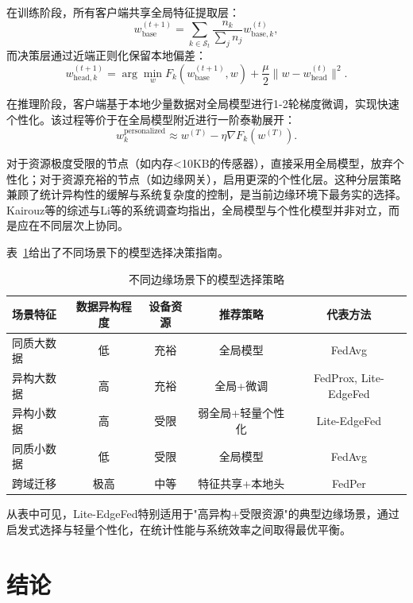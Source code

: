 \documentclass[a4paper,12pt]{article}
\begin{document}
在训练阶段，所有客户端共享全局特征提取层：
\begin{equation}
w_{\text{base}}^{(t+1)} = \sum_{k \in \mathcal{S}_t} \frac{n_k}{\sum_{j} n_j} w_{\text{base},k}^{(t)},
\end{equation}
而决策层通过近端正则化保留本地偏差：
\begin{equation}
w_{\text{head},k}^{(t+1)} = \arg\min_{w} F_k(w_{\text{base}}^{(t+1)}, w) + \frac{\mu}{2}\|w - w_{\text{head}}^{(t)}\|^2.
\end{equation}

在推理阶段，客户端基于本地少量数据对全局模型进行1-2轮梯度微调，实现快速个性化。该过程等价于在全局模型附近进行一阶泰勒展开：
\begin{equation}
w_k^{\text{personalized}} \approx w^{(T)} - \eta \nabla F_k(w^{(T)}).
\end{equation}

对于资源极度受限的节点（如内存<10KB的传感器），直接采用全局模型，放弃个性化；对于资源充裕的节点（如边缘网关），启用更深的个性化层。这种分层策略兼顾了统计异构性的缓解与系统复杂度的控制，是当前边缘环境下最务实的选择。Kairouz等\cite{kairouz2021advances}的综述与Li等\cite{li2023survey}的系统调查均指出，全局模型与个性化模型并非对立，而是应在不同层次上协同。

表~\ref{tab:model_choice}给出了不同场景下的模型选择决策指南。

\begin{table}[htbp]
\centering
\caption{不同边缘场景下的模型选择策略}
\label{tab:model_choice}
\begin{tabular}{lcccc}
\toprule
场景特征 & 数据异构程度 & 设备资源 & 推荐策略 & 代表方法 \\
\midrule
同质大数据 & 低 & 充裕 & 全局模型 & FedAvg \\
异构大数据 & 高 & 充裕 & 全局+微调 & FedProx, Lite-EdgeFed \\
异构小数据 & 高 & 受限 & 弱全局+轻量个性化 & Lite-EdgeFed \\
同质小数据 & 低 & 受限 & 全局模型 & FedAvg \\
跨域迁移 & 极高 & 中等 & 特征共享+本地头 & FedPer \\
\bottomrule
\end{tabular}
\end{table}

从表中可见，Lite-EdgeFed特别适用于"高异构+受限资源"的典型边缘场景，通过启发式选择与轻量个性化，在统计性能与系统效率之间取得最优平衡。

\section{结论}
\end{document}
